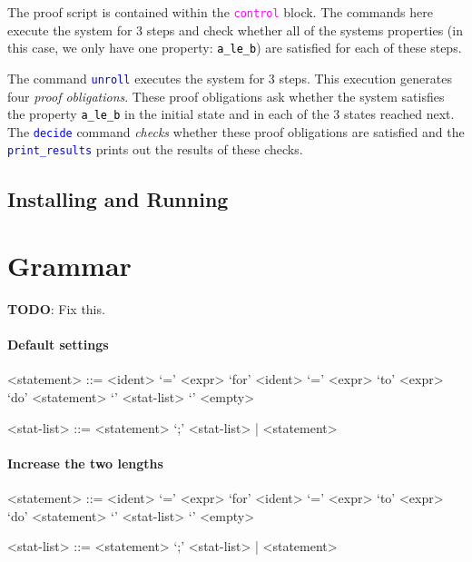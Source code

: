 \documentclass{article}
\newcommand{\uclid}{{\sc{Uclid}}}
\newcommand{\ident}[1]{\textcolor{black}{\texttt{#1}}}
\newcommand{\keywordbf}[1]{\textcolor{magenta}{\texttt{{#1}}}}
\newcommand{\proofcmd}[1]{\textcolor{blue}{\texttt{{#1}}}}
\begin{document}
The proof script is contained within the \keywordbf{control} block. The commands here execute the system for 3 steps and check whether all of the systems properties (in this case, we only have one property: \ident{a\_le\_b}) are satisfied for each of these steps. 

The command \proofcmd{unroll} executes the system for 3 steps. This execution generates four \emph{proof obligations}. These proof obligations ask whether the system satisfies the property \ident{a\_le\_b} in the initial state and in each of the 3 states reached next. The \proofcmd{decide} command \emph{checks} whether these proof obligations are satisfied and the \proofcmd{print\_results} prints out the results of these checks.

\subsection{Installing and Running \uclid{}}

\section{\uclid{} Grammar}

\textbf{TODO}: Fix this.

\paragraph{Default settings}
\begin{grammar}

<statement> ::= <ident> `=' <expr>
\alt `for' <ident> `=' <expr> `to' <expr> `do' <statement>
\alt `{' <stat-list> `}'
\alt <empty>

<stat-list> ::= <statement> `;' <stat-list> | <statement>

\end{grammar}
\paragraph{Increase the two lengths}
\setlength{\grammarparsep}{20pt plus 1pt minus 1pt} %
\setlength{\grammarindent}{12em} %

\begin{grammar}

<statement> ::= <ident> `=' <expr>
\alt `for' <ident> `=' <expr> `to' <expr> `do' <statement>
\alt `{' <stat-list> `}'
\alt <empty>

<stat-list> ::= <statement> `;' <stat-list> | <statement>

\end{grammar}
\end{document}
